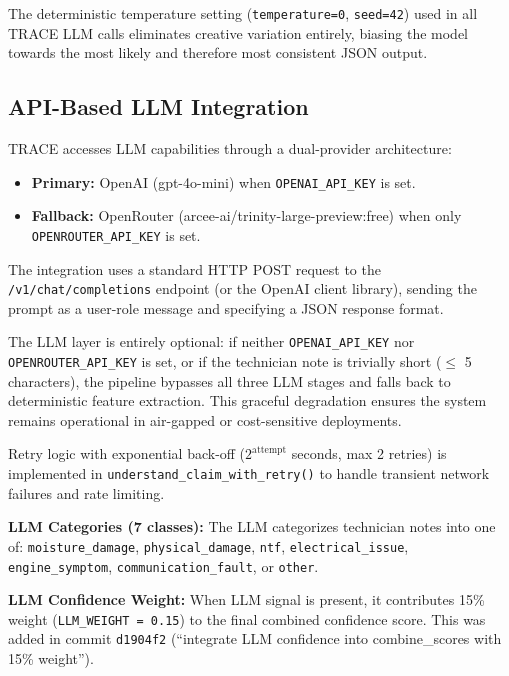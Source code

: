 \documentclass[10pt]{article}
\begin{document}
The deterministic temperature setting (\texttt{temperature=0}, \texttt{seed=42}) used in all TRACE LLM calls eliminates creative variation entirely, biasing the model towards the most likely and therefore most consistent JSON output.

\subsection{API-Based LLM Integration}

TRACE accesses LLM capabilities through a dual-provider architecture:

\begin{itemize}
    \item \textbf{Primary:} OpenAI (gpt-4o-mini) when \texttt{OPENAI\_API\_KEY} is set.
    \item \textbf{Fallback:} OpenRouter (arcee-ai/trinity-large-preview:free) when only \texttt{OPENROUTER\_API\_KEY} is set.
\end{itemize}

The integration uses a standard HTTP POST request to the \texttt{/v1/chat/completions} endpoint (or the OpenAI client library), sending the prompt as a user-role message and specifying a JSON response format.

The LLM layer is entirely optional: if neither \texttt{OPENAI\_API\_KEY} nor \texttt{OPENROUTER\_API\_KEY} is set, or if the technician note is trivially short ($\leq$ 5 characters), the pipeline bypasses all three LLM stages and falls back to deterministic feature extraction. This graceful degradation ensures the system remains operational in air-gapped or cost-sensitive deployments.

Retry logic with exponential back-off ($2^{\text{attempt}}$ seconds, max 2 retries) is implemented in \texttt{understand\_claim\_with\_retry()} to handle transient network failures and rate limiting.

\textbf{LLM Categories (7 classes):} The LLM categorizes technician notes into one of: \texttt{moisture\_damage}, \texttt{physical\_damage}, \texttt{ntf}, \texttt{electrical\_issue}, \texttt{engine\_symptom}, \texttt{communication\_fault}, or \texttt{other}.

\textbf{LLM Confidence Weight:} When LLM signal is present, it contributes 15\% weight (\texttt{LLM\_WEIGHT = 0.15}) to the final combined confidence score. This was added in commit \texttt{d1904f2} (``integrate LLM confidence into combine\_scores with 15\% weight'').
\end{document}

